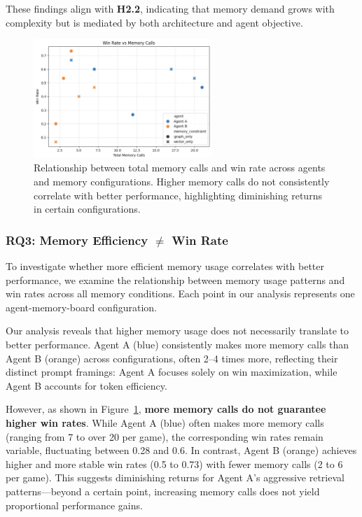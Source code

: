 \documentclass[10pt]{article}
\begin{document}
These findings align with \textbf{H2.2}, indicating that memory demand grows with complexity but is mediated by both architecture and agent objective.

\begin{figure}[ht]
    \centering
    \includegraphics[width=0.6\textwidth]{figures/analysis/scatter_win_rate.png}
    \caption{Relationship between total memory calls and win rate across agents and memory configurations. Higher memory calls do not consistently correlate with better performance, highlighting diminishing returns in certain configurations.}
    \label{fig:scatter_win_rate}
    \end{figure}

\subsubsection{RQ3: Memory Efficiency $\neq$ Win Rate}

To investigate whether more efficient memory usage correlates with better performance, we examine the relationship between memory usage patterns and win rates across all memory conditions. Each point in our analysis represents one agent-memory-board configuration.

Our analysis reveals that higher memory usage does not necessarily translate to better performance. Agent A (blue) consistently makes more memory calls than Agent B (orange) across configurations, often 2–4 times more, reflecting their distinct prompt framings: Agent A focuses solely on win maximization, while Agent B accounts for token efficiency.

However, as shown in Figure~\ref{fig:scatter_win_rate}, \textbf{more memory calls do not guarantee higher win rates}. While Agent A (blue) often makes more memory calls (ranging from 7 to over 20 per game), the corresponding win rates remain variable, fluctuating between 0.28 and 0.6. In contrast, Agent B (orange) achieves higher and more stable win rates (0.5 to 0.73) with fewer memory calls (2 to 6 per game). This suggests diminishing returns for Agent A's aggressive retrieval patterns—beyond a certain point, increasing memory calls does not yield proportional performance gains.
\end{document}
